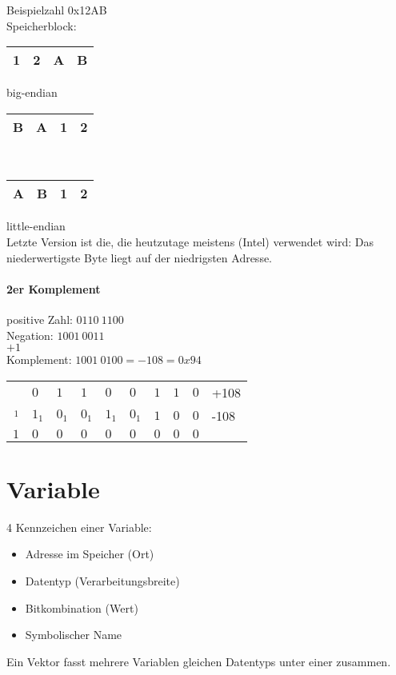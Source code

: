 Beispielzahl 0x12AB\medskip\\
Speicherblock:\\
\begin{tabular}{|l|l|l|l|}
\hline
1&2&A&B\\
\hline
\end{tabular} big-endian\\
\begin{tabular}{|l|l|l|l|}
\hline
B&A&1&2\\
\hline
\end{tabular}\\
\begin{tabular}{|l|l|l|l|}
\hline
A&B&1&2\\
\hline
\end{tabular} little-endian\\
Letzte Version ist die, die heutzutage meistens (Intel) verwendet wird: Das niederwertigste Byte liegt auf der niedrigsten Adresse.

\paragraph{2er Komplement}
positive Zahl: $\boxed{0}110 \: 1100$\\
Negation: $1001\: 0011$\\
$+1$\\
Komplement: $1001 \: 0100 = -108 = 0x94$\\
\begin{tabular}{r | l l l l l l l l l}
 & $0$&$1$&$1$&$0$&$0$&$1$&$1$&$0$ & +108\\
$_1$&$1_1$&$0_1$&$0_1$&$1_1$&$0_1$&$1$&$0$&$0$ & -108\\
\hline
$1$&$0$&$0$&$0$&$0$&$0$&$0$&$0$&$0$&\\

\end{tabular}

\section{Variable}
4 Kennzeichen einer Variable:
\begin{itemize}
\item Adresse im Speicher (Ort)
\item Datentyp (Verarbeitungsbreite)
\item Bitkombination (Wert)
\item Symbolischer Name
\end{itemize}
Ein Vektor fasst mehrere Variablen gleichen Datentyps unter einer zusammen.

